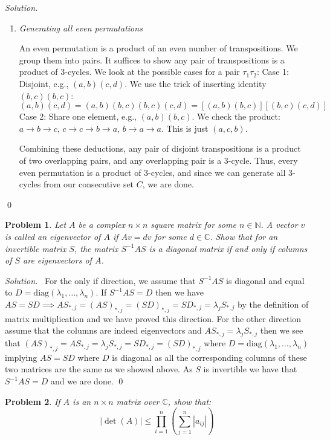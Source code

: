 \documentclass[12pt,a4paper]{article}
\newenvironment{solution}{%
  \par\noindent\textit{Solution.}\ }{\qed}
\theoremstyle{problemstyle}
\newtheorem{problem}{Problem}[section]
\def\bN{\mathbb{N}}
\begin{document}
\begin{solution}
\begin{enumerate}[\label=\Roman*.]
    \item \textit{Generating all even permutations}
    
    An even permutation is a product of an even number of transpositions. We group them into pairs. It suffices to show any pair of transpositions is a product of 3-cycles.
    We look at the possible cases for a pair $\tau_1\tau_2$:
    Case 1: Disjoint, e.g., $(a, b)(c, d)$. We use the trick of inserting identity $(b, c)(b, c)$:
    $$(a, b)(c, d) = (a, b)(b, c)(b, c)(c, d) = [(a, b)(b, c)][(b, c)(c, d)]$$
    Case 2: Share one element, e.g., $(a, b)(b, c)$.
    We check the product: $a \to b \to c$, $c \to c \to b \to a$, $b \to a \to a$. This is just $(a, c, b)$.
    
    Combining these deductions, any pair of disjoint transpositions is a product of two overlapping pairs, and any overlapping pair is a 3-cycle. Thus, every even permutation is a product of 3-cycles, and since we can generate all 3-cycles from our consecutive set $C$, we are done.
    \end{enumerate}
\end{solution}
\begin{problem}\label{prob:1.5}
    Let $A$ be a complex $n\times n$ square matrix for some $n\in\bN$. A vector $v$ is called an eigenvector of $A$ if $Av = dv$ for some $d \in \mathbb{C}$. Show that for an invertible matrix $S$, the matrix $S^{-1}AS$ is a diagonal matrix if and only if columns of $S$ are eigenvectors of $A$.
\end{problem}
\begin{solution}
    For the only if direction, we assume that $S^{-1}AS$ is diagonal and equal to $D=\text{diag}(\lambda_1,\ldots,\lambda_n)$. 
    If $S^{-1}AS=D$ then we have $AS=SD\implies AS_{*,j}=(AS)_{*,j}=(SD)_{*,j}=SD_{*,j}=\lambda_jS_{*,j}$ by the definition of matrix multiplication and we have proved this direction. 
    For the other direction assume that the columns are indeed eigenvectors and $AS_{*,j}=\lambda_jS_{*,j}$ then we see that $(AS)_{*,j}=AS_{*,j}=\lambda_jS_{*,j}=SD_{*,j}=(SD)_{*,j}$ where $D=\text{diag}(\lambda_1,\ldots,\lambda_n)$ implying $AS=SD$ where $D$ is diagonal as all the corresponding columns of these two matrices are the same as we showed above. 
    As $S$ is invertible we have that $S^{-1}AS=D$ and we are done.
\end{solution}
\begin{problem}\label{prob:1.6}
    If $A$ is an $n \times n$ matrix over $\mathbb{C}$, show that:
    \[
        |\det(A)| \le \prod_{i=1}^{n} \left( \sum_{j=1}^{n} |a_{ij}| \right)
    \]
\end{problem}
\end{document}
